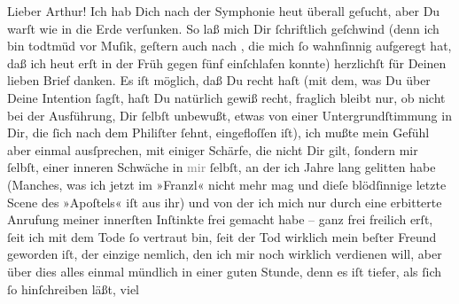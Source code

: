 \pstart\center{}Lieber Arthur!\pend\vspace{0.5em}
\pstart
           Ich hab Dich nach der Symphonie heut überall geſucht, aber Du warſt wie in die Erde verſunken. So
               laß mich Dir ſchriftlich geſchwind (denn ich bin todtmüd vor Muſik, geſtern auch nach
                  \label{K_L01478-1v}\label{K_L01478-1}, die mich ſo wahnſinnig aufgeregt hat, daß ich heut erſt in der Früh gegen
               fünf einſchlafen konnte) herzlichſt für Deinen lieben Brief danken. Es iſt möglich,
               daß Du recht haſt (mit dem, was Du über Deine Intention ſagſt, haſt Du natürlich
               gewiß recht, fraglich bleibt nur, ob nicht bei der Ausführung, Dir ſelbſt unbewußt,
               etwas von einer Untergrundſtimmung in Dir, die ſich nach dem Philiſter ſehnt,
               eingefloſſen iſt), ich mußte mein Gefühl aber einmal ausſprechen, mit einiger
               Schärfe, die nicht Dir gilt, ſondern mir ſelbſt, einer inneren Schwäche in
                  \textcolor{gray}{mir}{ }ſelbſt, {\pb}an der
               ich Jahre lang gelitten habe (Manches, was ich jetzt im »Franzl« nicht mehr mag und dieſe blödſinnige letzte Scene des
                  »Apoſtels« iſt aus ihr) und von der ich mich
               nur durch eine erbitterte Anrufung meiner innerſten Inſtinkte \label{LL287-2v}frei gemacht habe – ganz frei freilich erſt, ſeit ich mit dem
                  Tode ſo vertraut bin, ſeit der Tod wirklich mein beſter Freund geworden
                  iſt\label{LL287-2h}, der einzige nemlich, den ich mir noch wirklich verdienen will,
                  \label{LL287-3v}aber über dies alles einmal mündlich in
                  einer guten Stunde, denn es iſt tiefer, als ſich ſo hinſchreiben läßt, viel
